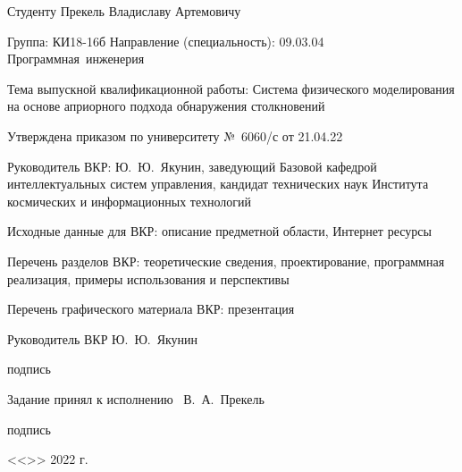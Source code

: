 {
Студенту Прекель Владиславу Артемовичу

Группа: КИ18-16б Направление (специальность): 09.03.04 Программная~инженерия

Тема выпускной квалификационной работы: Система физического моделирования на основе априорного подхода обнаружения столкновений

Утверждена приказом по университету №~6060/с от 21.04.22

Руководитель ВКР: Ю.~Ю.~Якунин, заведующий Базовой кафедрой интеллектуальных систем управления, кандидат технических наук
Института космических и информационных технологий

Исходные данные для ВКР: описание предметной области, Интернет ресурсы

Перечень разделов ВКР: теоретические сведения, проектирование, программная реализация, примеры использования и перспективы

Перечень графического материала ВКР: презентация

\vfill

\begin{spacing}{1}
    \setlength{\parindent}{0cm}

    Руководитель ВКР
    \hfill
    \uline{\hspace{10.5ex}}
    \hspace{6ex}
    Ю.~Ю.~Якунин

    \vspace{-4pt}

    \hfill
    {\footnotesize подпись}
    \hspace{23ex}


    Задание принял к исполнению~
    \hfill
    \uline{\hspace{10.5ex}}
    \hspace{7ex}
    В.~А.~Прекель

    \vspace{-4pt}

    \hfill
    {\footnotesize подпись}
    \hspace{23ex}

    \vspace{1em}

    \hfill <<\uline{\hspace{3ex}}>> \uline{\hspace{9ex}} 2022 г.

\end{spacing}
}

\thispagestyle{empty}

\clearpage
